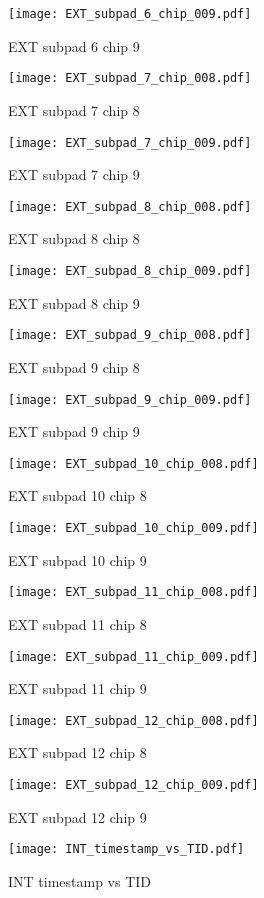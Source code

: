 \documentclass[a4paper,11pt]{article}
\begin{document}
\begin{figure}[htbp] \centering\texttt{[image: EXT\_subpad\_6\_chip\_009.pdf]}\caption{EXT subpad 6 chip 9} \end{figure} 
\begin{figure}[htbp] \centering\texttt{[image: EXT\_subpad\_7\_chip\_008.pdf]}\caption{EXT subpad 7 chip 8} \end{figure} 
\begin{figure}[htbp] \centering\texttt{[image: EXT\_subpad\_7\_chip\_009.pdf]}\caption{EXT subpad 7 chip 9} \end{figure} 
\begin{figure}[htbp] \centering\texttt{[image: EXT\_subpad\_8\_chip\_008.pdf]}\caption{EXT subpad 8 chip 8} \end{figure} 
\begin{figure}[htbp] \centering\texttt{[image: EXT\_subpad\_8\_chip\_009.pdf]}\caption{EXT subpad 8 chip 9} \end{figure} 
\begin{figure}[htbp] \centering\texttt{[image: EXT\_subpad\_9\_chip\_008.pdf]}\caption{EXT subpad 9 chip 8} \end{figure} 
\begin{figure}[htbp] \centering\texttt{[image: EXT\_subpad\_9\_chip\_009.pdf]}\caption{EXT subpad 9 chip 9} \end{figure} 
\begin{figure}[htbp] \centering\texttt{[image: EXT\_subpad\_10\_chip\_008.pdf]}\caption{EXT subpad 10 chip 8} \end{figure} 
\begin{figure}[htbp] \centering\texttt{[image: EXT\_subpad\_10\_chip\_009.pdf]}\caption{EXT subpad 10 chip 9} \end{figure} 
\begin{figure}[htbp] \centering\texttt{[image: EXT\_subpad\_11\_chip\_008.pdf]}\caption{EXT subpad 11 chip 8} \end{figure} 
\begin{figure}[htbp] \centering\texttt{[image: EXT\_subpad\_11\_chip\_009.pdf]}\caption{EXT subpad 11 chip 9} \end{figure} 
\begin{figure}[htbp] \centering\texttt{[image: EXT\_subpad\_12\_chip\_008.pdf]}\caption{EXT subpad 12 chip 8} \end{figure} 
\begin{figure}[htbp] \centering\texttt{[image: EXT\_subpad\_12\_chip\_009.pdf]}\caption{EXT subpad 12 chip 9} \end{figure}

\begin{figure}[htbp] \centering\texttt{[image: INT\_timestamp\_vs\_TID.pdf]}\caption{INT timestamp vs TID} \end{figure}
\end{document}
